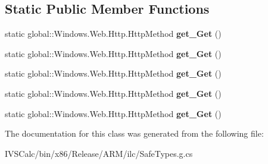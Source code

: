 \subsection*{Static Public Member Functions}
\begin{DoxyCompactItemize}
\item 
\mbox{\label{class_windows_1_1_web_1_1_http_1_1_http_method_a9b6ef5f32c9a42a7227744e120ffc93a}} 
static global\+::\+Windows.\+Web.\+Http.\+Http\+Method {\bfseries get\+\_\+\+Get} ()
\item 
\mbox{\label{class_windows_1_1_web_1_1_http_1_1_http_method_a9b6ef5f32c9a42a7227744e120ffc93a}} 
static global\+::\+Windows.\+Web.\+Http.\+Http\+Method {\bfseries get\+\_\+\+Get} ()
\item 
\mbox{\label{class_windows_1_1_web_1_1_http_1_1_http_method_a9b6ef5f32c9a42a7227744e120ffc93a}} 
static global\+::\+Windows.\+Web.\+Http.\+Http\+Method {\bfseries get\+\_\+\+Get} ()
\item 
\mbox{\label{class_windows_1_1_web_1_1_http_1_1_http_method_a9b6ef5f32c9a42a7227744e120ffc93a}} 
static global\+::\+Windows.\+Web.\+Http.\+Http\+Method {\bfseries get\+\_\+\+Get} ()
\item 
\mbox{\label{class_windows_1_1_web_1_1_http_1_1_http_method_a9b6ef5f32c9a42a7227744e120ffc93a}} 
static global\+::\+Windows.\+Web.\+Http.\+Http\+Method {\bfseries get\+\_\+\+Get} ()
\end{DoxyCompactItemize}


The documentation for this class was generated from the following file\+:\begin{DoxyCompactItemize}
\item 
I\+V\+S\+Calc/bin/x86/\+Release/\+A\+R\+M/ilc/Safe\+Types.\+g.\+cs\end{DoxyCompactItemize}
